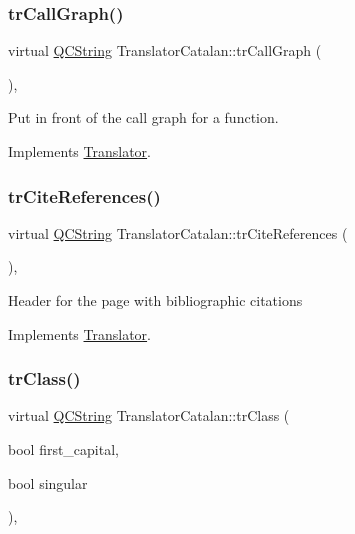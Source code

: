 \subsubsection{\texorpdfstring{trCallGraph()}{trCallGraph()}}
{\footnotesize\ttfamily virtual \mbox{\hyperlink{class_q_c_string}{Q\+C\+String}} Translator\+Catalan\+::tr\+Call\+Graph (\begin{DoxyParamCaption}{ }\end{DoxyParamCaption})\hspace{0.3cm}{\ttfamily [inline]}, {\ttfamily [virtual]}}

Put in front of the call graph for a function. 

Implements \mbox{\hyperlink{class_translator}{Translator}}.

\mbox{\label{class_translator_catalan_ad9653ad20d3a6568eae019b0029501cc}} 
\subsubsection{\texorpdfstring{trCiteReferences()}{trCiteReferences()}}
{\footnotesize\ttfamily virtual \mbox{\hyperlink{class_q_c_string}{Q\+C\+String}} Translator\+Catalan\+::tr\+Cite\+References (\begin{DoxyParamCaption}{ }\end{DoxyParamCaption})\hspace{0.3cm}{\ttfamily [inline]}, {\ttfamily [virtual]}}

Header for the page with bibliographic citations 

Implements \mbox{\hyperlink{class_translator}{Translator}}.

\mbox{\label{class_translator_catalan_a9015625cbaa9814d60d2bcbc1ed16f58}} 
\subsubsection{\texorpdfstring{trClass()}{trClass()}}
{\footnotesize\ttfamily virtual \mbox{\hyperlink{class_q_c_string}{Q\+C\+String}} Translator\+Catalan\+::tr\+Class (\begin{DoxyParamCaption}\item[{bool}]{first\+\_\+capital,  }\item[{bool}]{singular }\end{DoxyParamCaption})\hspace{0.3cm}{\ttfamily [inline]}, {\ttfamily [virtual]}}

